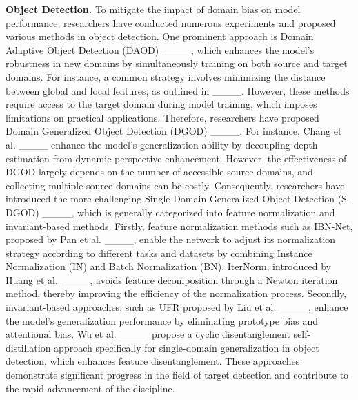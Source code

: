 \textbf{Object Detection.} 
To mitigate the impact of domain bias on model performance, researchers have conducted numerous experiments and proposed various methods in object detection. One prominent approach is Domain Adaptive Object Detection (DAOD) ____, which enhances the model's robustness in new domains by simultaneously training on both source and target domains. For instance, a common strategy involves minimizing the distance between global and local features, as outlined in ____. However, these methods require access to the target domain during model training, which imposes limitations on practical applications. Therefore, researchers have proposed Domain Generalized Object Detection (DGOD) ____. For instance, Chang et al. ____ enhance the model's generalization ability by decoupling depth estimation from dynamic perspective enhancement. However, the effectiveness of DGOD largely depends on the number of accessible source domains, and collecting multiple source domains can be costly. Consequently, researchers have introduced the more challenging Single Domain Generalized Object Detection (S-DGOD) ____, which is generally categorized into feature normalization and invariant-based methods. Firstly, feature normalization methods such as IBN-Net, proposed by Pan et al. ____, enable the network to adjust its normalization strategy according to different tasks and datasets by combining Instance Normalization (IN) and Batch Normalization (BN). IterNorm, introduced by Huang et al. ____, avoids feature decomposition through a Newton iteration method, thereby improving the efficiency of the normalization process. Secondly, invariant-based approaches, such as UFR proposed by Liu et al. ____, enhance the model's generalization performance by eliminating prototype bias and attentional bias. Wu et al. ____ propose a cyclic disentanglement self-distillation approach specifically for single-domain generalization in object detection, which enhances feature disentanglement. These approaches demonstrate significant progress in the field of target detection and contribute to the rapid advancement of the discipline.

